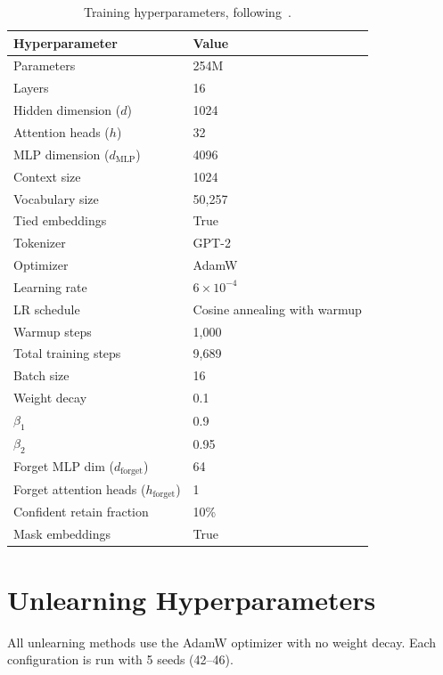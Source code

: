 \documentclass{article} %
\begin{document}
\begin{table}[h]
  \centering
  \small
  \begin{tabular}{@{}ll@{}}
    \toprule
    \textbf{Hyperparameter} & \textbf{Value} \\
    \midrule
    Parameters & 254M \\
    Layers & 16 \\
    Hidden dimension ($d$) & 1024 \\
    Attention heads ($h$) & 32 \\
    MLP dimension ($d_\text{MLP}$) & 4096 \\
    Context size & 1024 \\
    Vocabulary size & 50{,}257 \\
    Tied embeddings & True \\
    Tokenizer & GPT-2 \\
    \midrule
    Optimizer & AdamW \\
    Learning rate & $6 \times 10^{-4}$ \\
    LR schedule & Cosine annealing with warmup \\
    Warmup steps & 1{,}000 \\
    Total training steps & 9{,}689 \\
    Batch size & 16 \\
    Weight decay & 0.1 \\
    $\beta_1$ & 0.9 \\
    $\beta_2$ & 0.95 \\
    \midrule
    Forget MLP dim ($d_\text{forget}$) & 64 \\
    Forget attention heads ($h_\text{forget}$) & 1 \\
    Confident retain fraction & 10\% \\
    Mask embeddings & True \\
    \bottomrule
  \end{tabular}
  \caption{Training hyperparameters, following~\citet{shilov2025datafilteringknowledgelocalization}.}
  \label{tab:training-hyperparams}
\end{table}

\section{Unlearning Hyperparameters} \label{app:unlearning-hyperparams}

All unlearning methods use the AdamW optimizer with no weight decay. Each configuration is run with 5 seeds (42--46).
\end{document}
